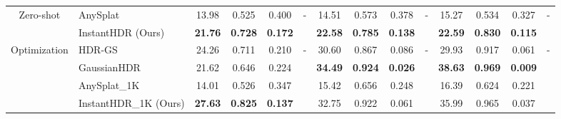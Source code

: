 \documentclass[runningheads]{llncs}
\begin{document}
\begin{table}[t]
{\begin{tabular}{cl cccc cccc cccc}
\multirow{2}{*}{Zero-shot}
& AnySplat~\cite{jiang2025anysplat} & 13.98 & 0.525 & 0.400 & \multirow{2}{*}{-}& 14.51 & 0.573 & 0.378 & \multirow{2}{*}{-} & 15.27 & 0.534 & 0.327 & \multirow{2}{*}{-} \\
& InstantHDR (Ours) & \textbf{21.76} & \textbf{0.728} & \textbf{0.172} &  & \textbf{22.58} & \textbf{0.785} & \textbf{0.138} &  & \textbf{22.59} & \textbf{0.830} & \textbf{0.115} &  \\
\midrule
\multirow{4}{*}{Optimization}
& HDR-GS~\cite{cai2024hdr} & 24.26 & 0.711 & 0.210 & \multirow{4}{*}{-} & 30.60 & 0.867 & 0.086 & \multirow{4}{*}{-} & 29.93 & 0.917 & 0.061 & \multirow{4}{*}{-} \\
& GaussianHDR~\cite{liu2025gausshdr} & 21.62 & 0.646 & 0.224 &  & \textbf{34.49} & \textbf{0.924} & \textbf{0.026} &  & \textbf{38.63} & \textbf{0.969} & \textbf{0.009} &  \\
& AnySplat\_1K~\cite{jiang2025anysplat} & 14.01 & 0.526 & 0.347 &  & 15.42 & 0.656 & 0.248 &  & 16.39 & 0.624 & 0.221 &  \\
& InstantHDR\_1K (Ours) & \textbf{27.63} & \textbf{0.825} & \textbf{0.137} &  & 32.75 & 0.922 & 0.061 &  & 35.99 & 0.965 & 0.037 &  \\
\bottomrule[2pt]
\end{tabular}
}
\end{table}
\end{document}
